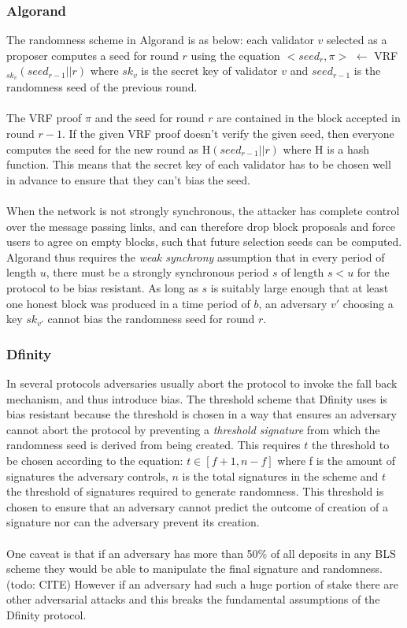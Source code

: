 \documentclass[10pt,journal,compsoc]{IEEEtran}
\begin{document}
\subsubsection{Algorand}
The randomness scheme in Algorand is as below:
each validator $v$ selected as a proposer computes a seed for round $r$ using the equation $< seed_r, \pi >$ $\leftarrow$ VRF$_{sk_{v}}(seed_{r-1}||r)$ where $sk_v$ is the secret key of validator $v$ and $seed_{r-1}$ is the randomness seed of the previous round.
\\\\    
The VRF proof $\pi$ and the seed for round $r$ are contained in the block accepted in round $r-1$. If the given VRF proof doesn't verify the given seed, then everyone computes the seed for the new round as H$(seed_{r-1}||r)$ where H is a hash function. This means that the secret key of each validator has to be chosen well in advance to ensure that they can't bias the seed.
\\\\
When the network is not strongly synchronous, the attacker has complete control over the message passing links, and can therefore drop block proposals and force users to agree on empty blocks, such that future selection seeds can be computed. Algorand thus requires the \emph{weak synchrony} assumption that in every period of length $u$, there must be a strongly synchronous period $s$ of length $s < u$ for the protocol to be bias resistant.  As long as $s$ is suitably large enough that at least one honest block was produced in a time period of $b$, an adversary $v'$ choosing a key $sk_{v'}$ cannot bias the randomness seed for round $r$. 

\subsubsection{Dfinity}
In several protocols adversaries usually abort the protocol to invoke the fall back mechanism, and thus introduce bias. The threshold scheme that Dfinity uses is bias resistant because the threshold is chosen in a way that ensures an adversary cannot abort the protocol by preventing a \emph{threshold signature} from which the randomness seed is derived from being created. This requires $t$ the threshold to be chosen according to the equation: 
$t \in [f+1, n-f]$ where f is the amount of signatures the adversary controls,  
$n$ is the total signatures in the scheme and $t$ the threshold of signatures required to generate randomness. This threshold is chosen to ensure that an adversary cannot predict the outcome of creation of a signature nor can the adversary prevent its creation. 
\\\\
One caveat is that if an adversary has more than 50\% of all deposits in any BLS scheme they would be able to manipulate the final signature and randomness. (todo: CITE) However if an adversary had such a huge portion of stake there are other adversarial attacks and this breaks the fundamental assumptions of the Dfinity protocol.
\end{document}
